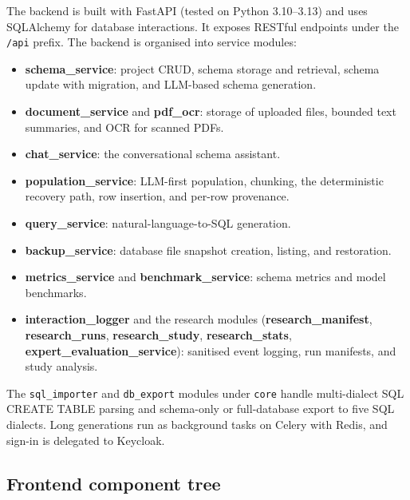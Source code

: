 \documentclass[11pt,a4paper]{article}
\begin{document}
The backend is built with FastAPI (tested on Python 3.10--3.13) and uses SQLAlchemy for database interactions. It exposes RESTful endpoints under the \texttt{/api} prefix. The backend is organised into service modules:
\begin{itemize}
  \item \textbf{schema\_service}: project CRUD, schema storage and retrieval, schema update with migration, and LLM-based schema generation.
  \item \textbf{document\_service} and \textbf{pdf\_ocr}: storage of uploaded files, bounded text summaries, and OCR for scanned PDFs.
  \item \textbf{chat\_service}: the conversational schema assistant.
  \item \textbf{population\_service}: LLM-first population, chunking, the deterministic recovery path, row insertion, and per-row provenance.
  \item \textbf{query\_service}: natural-language-to-SQL generation.
  \item \textbf{backup\_service}: database file snapshot creation, listing, and restoration.
  \item \textbf{metrics\_service} and \textbf{benchmark\_service}: schema metrics and model benchmarks.
  \item \textbf{interaction\_logger} and the research modules (\textbf{research\_manifest}, \textbf{research\_runs}, \textbf{research\_study}, \textbf{research\_stats}, \textbf{expert\_evaluation\_service}): sanitised event logging, run manifests, and study analysis.
\end{itemize}
The \texttt{sql\_importer} and \texttt{db\_export} modules under \texttt{core} handle multi-dialect SQL CREATE TABLE parsing and schema-only or full-database export to five SQL dialects. Long generations run as background tasks on Celery with Redis, and sign-in is delegated to Keycloak.

\subsection{Frontend component tree}
\end{document}
